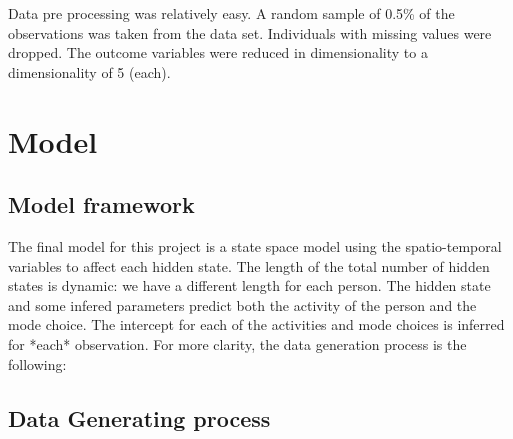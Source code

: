 \documentclass{article}
\begin{document}
Data pre processing was relatively easy. A random sample of 0.5\% of the observations was taken from the data set. Individuals with missing values were dropped. The outcome variables were reduced in dimensionality to a dimensionality of 5 (each). 

\section{Model}
\subsection{Model framework}

The final model for this project is a state space model using the spatio-temporal variables to affect each hidden state. The length of the total number of hidden states is dynamic: we have a different length for each person. The hidden state and some infered parameters predict both the activity of the person and the mode choice. The intercept for each of the activities and mode choices is inferred for *each* observation. For more clarity, the data generation process is the following:

\subsection{Data Generating process}
\end{document}

